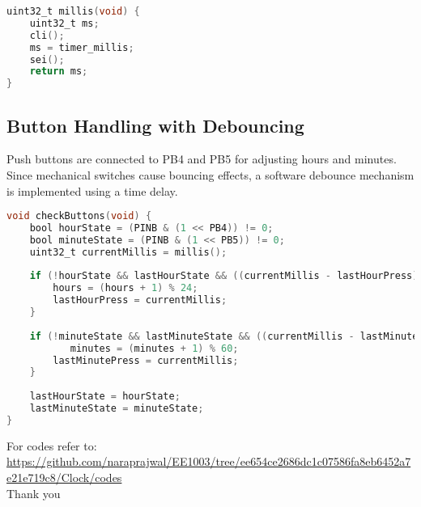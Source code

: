 \documentclass{article}
\begin{document}
\begin{lstlisting}[language=C, caption=Time Keeping]
uint32_t millis(void) {
    uint32_t ms;
    cli();
    ms = timer_millis;
    sei();
    return ms;
}
\end{lstlisting}

\subsection{Button Handling with Debouncing}
Push buttons are connected to PB4 and PB5 for adjusting hours and minutes. Since mechanical switches cause bouncing effects, a software debounce mechanism is implemented using a time delay.

\begin{lstlisting}[language=C, caption=Button Debouncing]
void checkButtons(void) {
    bool hourState = (PINB & (1 << PB4)) != 0;
    bool minuteState = (PINB & (1 << PB5)) != 0;
    uint32_t currentMillis = millis();
    
    if (!hourState && lastHourState && ((currentMillis - lastHourPress) > debounceDelay)) {
        hours = (hours + 1) % 24;
        lastHourPress = currentMillis;
    }
    
    if (!minuteState && lastMinuteState && ((currentMillis - lastMinutePress) > debounceDelay)) {
           minutes = (minutes + 1) % 60;
        lastMinutePress = currentMillis;
    }
    
    lastHourState = hourState;
    lastMinuteState = minuteState;
}
\end{lstlisting}
For codes refer to:\\
\url{https://github.com/naraprajwal/EE1003/tree/ee654ce2686dc1c07586fa8eb6452a7e21e719c8/Clock/codes}\\

\centering
Thank you
\end{document}
